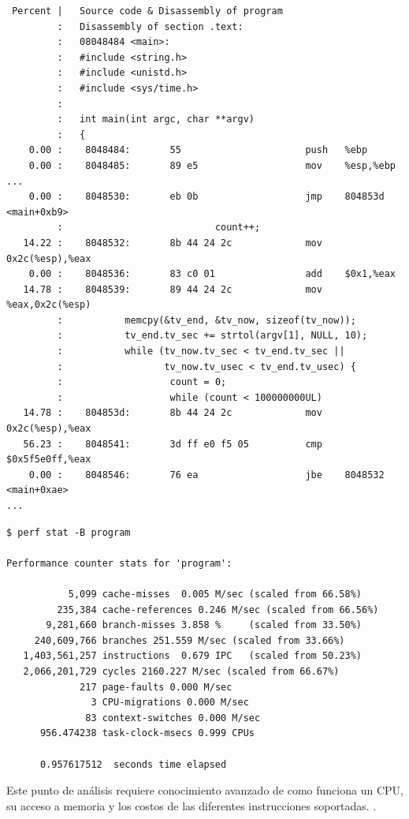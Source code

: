 \documentclass[a4paper]{report}
\begin{document}
\begin{lstlisting}
 Percent |   Source code & Disassembly of program
         :   Disassembly of section .text:
         :   08048484 <main>:
         :   #include <string.h>
         :   #include <unistd.h>
         :   #include <sys/time.h>
         :
         :   int main(int argc, char **argv)
         :   {
    0.00 :    8048484:       55                      push   %ebp
    0.00 :    8048485:       89 e5                   mov    %esp,%ebp
...
    0.00 :    8048530:       eb 0b                   jmp    804853d <main+0xb9>
         :                           count++;
   14.22 :    8048532:       8b 44 24 2c             mov    0x2c(%esp),%eax
    0.00 :    8048536:       83 c0 01                add    $0x1,%eax
   14.78 :    8048539:       89 44 24 2c             mov    %eax,0x2c(%esp)
         :           memcpy(&tv_end, &tv_now, sizeof(tv_now));
         :           tv_end.tv_sec += strtol(argv[1], NULL, 10);
         :           while (tv_now.tv_sec < tv_end.tv_sec ||
         :                  tv_now.tv_usec < tv_end.tv_usec) {
         :                   count = 0;
         :                   while (count < 100000000UL)
   14.78 :    804853d:       8b 44 24 2c             mov    0x2c(%esp),%eax
   56.23 :    8048541:       3d ff e0 f5 05          cmp    $0x5f5e0ff,%eax
    0.00 :    8048546:       76 ea                   jbe    8048532 <main+0xae>
...
\end{lstlisting}

\begin{lstlisting}
$ perf stat -B program

Performance counter stats for 'program':

           5,099 cache-misses  0.005 M/sec (scaled from 66.58%)
         235,384 cache-references 0.246 M/sec (scaled from 66.56%)
       9,281,660 branch-misses 3.858 %     (scaled from 33.50%)
     240,609,766 branches 251.559 M/sec (scaled from 33.66%)
   1,403,561,257 instructions  0.679 IPC   (scaled from 50.23%)
   2,066,201,729 cycles 2160.227 M/sec (scaled from 66.67%)
             217 page-faults 0.000 M/sec
               3 CPU-migrations 0.000 M/sec
              83 context-switches 0.000 M/sec
      956.474238 task-clock-msecs 0.999 CPUs

      0.957617512  seconds time elapsed
\end{lstlisting}

Este punto de análisis requiere conocimiento avanzado de como funciona un CPU, su acceso a memoria y los costos de las diferentes instrucciones soportadas. \cite{hennessy-patterson} \cite{intel}.
\end{document}
